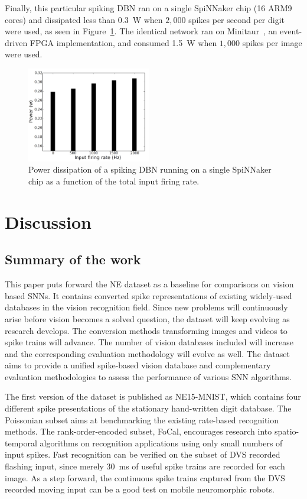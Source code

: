 \documentclass{frontiersENG} %
\begin{document}
Finally, this particular spiking DBN ran on a single SpiNNaker chip (16 ARM9 cores) and dissipated less than 0.3~W when $2,000$ spikes per second per digit were used, as seen in Figure~\ref{Fig:spinnchipPower}. The identical network ran on Minitaur~\citep{neil2014minitaur}, an event-driven FPGA implementation, and consumed 1.5~W when $1,000$ spikes per image were used.  


\begin{figure}[hbt!]
	\centering
	\includegraphics[width=0.48\textwidth]{fig12}
	\caption{Power dissipation of a spiking DBN running on a single SpiNNaker chip as a function of the total input firing rate.}
	\label{Fig:spinnchipPower}
\end{figure} 

\section{Discussion}
\label{sec:summ}
\subsection{Summary of the work}
This paper puts forward the NE dataset as a baseline for comparisons on vision based SNNs.
It contains converted spike representations of existing widely-used databases in the vision recognition field.
Since new problems will continuously arise before vision becomes a solved question, the dataset will keep evolving as research develops. 
The conversion methods transforming images and videos to spike trains will advance. The number of vision databases included will increase and the corresponding evaluation methodology will evolve as well.
The dataset aims to provide a unified spike-based vision database and complementary evaluation methodologies to assess the performance of various SNN algorithms.

The first version of the dataset is published as NE15-MNIST, which contains four different spike presentations of the stationary hand-written digit database.
The Poissonian subset aims at benchmarking the existing rate-based recognition methods.
The rank-order-encoded subset, FoCal, encourages research into spatio-temporal algorithms on recognition applications using only small numbers of input spikes.
Fast recognition can be verified on the subset of DVS recorded flashing input, since merely 30~ms of useful spike trains are recorded for each image.
As a step forward, the continuous spike trains captured from the DVS recorded moving input can be a good test on mobile neuromorphic robots.
\end{document}

